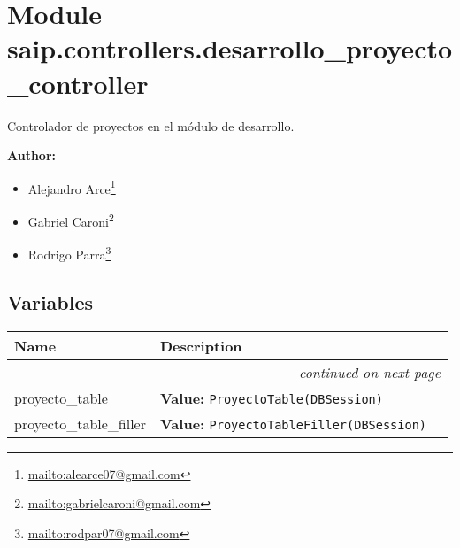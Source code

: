 %
%
%


\section{Module saip.controllers.desarrollo\_proyecto\_controller}

    \label{saip:controllers:desarrollo_proyecto_controller}
Controlador de proyectos en el módulo de desarrollo.

\textbf{Author:} \begin{itemize}
\setlength{\parskip}{0.6ex}
  \item Alejandro 
    Arce\footnote{\href{mailto:alearce07@gmail.com}{mailto:alearce07@gmail.com}}

  \item Gabriel 
    Caroni\footnote{\href{mailto:gabrielcaroni@gmail.com}{mailto:gabrielcaroni@gmail.com}}

  \item Rodrigo 
    Parra\footnote{\href{mailto:rodpar07@gmail.com}{mailto:rodpar07@gmail.com}}

\end{itemize}





  \subsection{Variables}

    \vspace{-1cm}
\hspace{\varindent}\begin{longtable}{|p{\varnamewidth}|p{\vardescrwidth}|l}
\cline{1-2}
\cline{1-2} \centering \textbf{Name} & \centering \textbf{Description}& \\
\cline{1-2}
\endhead\cline{1-2}\multicolumn{3}{r}{\small\textit{continued on next page}}\\\endfoot\cline{1-2}
\endlastfoot\raggedright p\-r\-o\-y\-e\-c\-t\-o\-\_\-t\-a\-b\-l\-e\- & \raggedright \textbf{Value:} 
{\tt ProyectoTable(DBSession)}&\\
\cline{1-2}
\raggedright p\-r\-o\-y\-e\-c\-t\-o\-\_\-t\-a\-b\-l\-e\-\_\-f\-i\-l\-l\-e\-r\- & \raggedright \textbf{Value:} 
{\tt ProyectoTableFiller(DBSession)}&\\
\cline{1-2}
\end{longtable}


